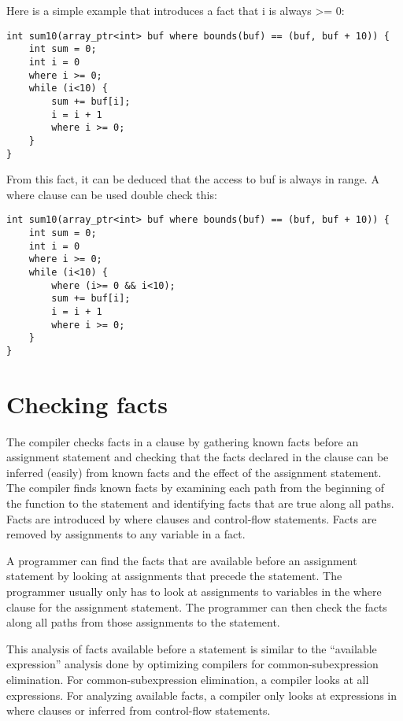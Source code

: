 Here is a simple example that introduces a fact that i is always
\textgreater{}= 0:

\begin{verbatim}
int sum10(array_ptr<int> buf where bounds(buf) == (buf, buf + 10)) {
    int sum = 0;
    int i = 0
    where i >= 0;
    while (i<10) {
        sum += buf[i];
        i = i + 1
        where i >= 0;
    }
}
\end{verbatim}

From this fact, it can be deduced that the access to buf is always in
range. A where clause can be used double check this:

\begin{verbatim}
int sum10(array_ptr<int> buf where bounds(buf) == (buf, buf + 10)) {
    int sum = 0;
    int i = 0
    where i >= 0;
    while (i<10) {
        where (i>= 0 && i<10);
        sum += buf[i];
        i = i + 1
        where i >= 0;
    }
}
\end{verbatim}

\section{Checking facts}

The compiler checks facts in a  clause by gathering known
facts before an assignment statement and checking that the facts
declared in the  clause can be inferred (easily) from
known facts and the effect of the assignment statement. The compiler
finds known facts by examining each path from the beginning of the
function to the statement and identifying facts that are true along all
paths. Facts are introduced by where clauses and control-flow
statements. Facts are removed by assignments to any variable in a fact.

A programmer can find the facts that are available before an assignment
statement by looking at assignments that precede the statement. The
programmer usually only has to look at assignments to variables in the
where clause for the assignment statement. The programmer can then check
the facts along all paths from those assignments to the statement.

This analysis of facts available before a statement is similar to the
``available expression'' analysis done by optimizing compilers for
common-subexpression elimination. For common-subexpression elimination,
a compiler looks at all expressions. For analyzing available facts, a
compiler only looks at expressions in where clauses or inferred from
control-flow statements.

